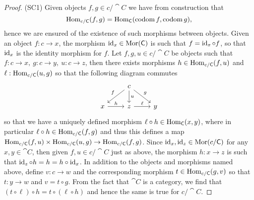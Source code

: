 \begin{proof}
  (SC1) Given objects \(f, g \in c/\cat C\) we have from construction that
  \[
    \operatorname{Hom}_{c/\mathsf C}(f, g) = \operatorname{Hom}_{\mathsf C}(\operatorname{codom} f, \operatorname{codom} g),
  \]
  hence we are
  ensured of the existence of such morphisms between objects. Given an object
  \(f: c \to x\), the morphism \(\operatorname{id}_x \in \operatorname{Mor}(\mathsf C)\) is such that \(f =
  \operatorname{id}_x \circ f\), so that \(\operatorname{id}_x\) is the identity morphism for \(f\). Let
  \(f, g, u \in c/\cat C\) be objects such that \(f: c \to x,\ g: c \to y,\ u: c
  \to z\), then there exists morphisms \(h \in \operatorname{Hom}_{c/\mathsf C}(f, u)\) and
  \(\ell: \operatorname{Hom}_{c/\mathsf C}(u, g)\) so that the following diagram commutes
  \[
    \begin{tikzcd}
        &c \ar[dl, swap, "f"] \ar[d, "u"] \ar[dr, "g"] & \\
      x \ar[r, "h"]
        &z \ar[r, "\ell"]
          &y
    \end{tikzcd}
  \] 
  so that we have a uniquely defined morphism \(\ell \circ h \in \operatorname{Hom}_{\mathsf
  C}(x, y)\), where in particular \(\ell \circ h \in \operatorname{Hom}_{c/\mathsf C}(f, g)\) and
  thus this defines a map \(\operatorname{Hom}_{c/\mathsf C}(f, u) \times \operatorname{Hom}_{c/\mathsf C}(u, g)
  \to \operatorname{Hom}_{c/\mathsf C}(f, g)\). Since \(\operatorname{id}_x, \operatorname{id}_z \in \operatorname{Mor}(c/\mathsf C)\) for any
  \(x, y \in \cat C\), then given \(f, u \in c/\cat C\) just as above, the
  morphism \(h: x \to z\) is such that \(\operatorname{id}_z \circ h = h = h \circ \operatorname{id}_x\). In
  addition to the objects and morphisms named above, define \(v: c \to w\) and
  the corresponding morphism \(t \in \operatorname{Hom}_{c/\mathsf C}(g, v)\) so that \(t: y \to
  w\) and \(v = t \circ g\). From the fact that \(\cat C\) is a category, we
  find that \((t \circ \ell) \circ h = t \circ (\ell \circ h)\) and hence the
  same is true for \(c/\cat C\).


\end{proof}
